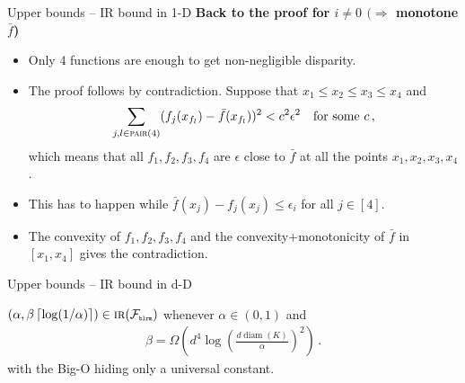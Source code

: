 \documentclass{beamer}
\newcommand{\pair}{\operatorname{\textsc{pair}}}
\newcommand{\diam}{\operatorname{diam}}
\newcommand{\cF}{\mathcal{F}}
\newcommand{\pr}{\text{\tiny\texttt{r}}}
\newcommand{\pb}{\text{\tiny\texttt{b}}}
\newcommand{\pl}{\text{\tiny\texttt{l}}}
\renewcommand{\pm}{\text{\tiny\texttt{m}}}
\newcommand{\IR}{\operatorname{\textsc{ir}}}
\newcommand{\ceil}[1]{\left\lceil #1 \right\rceil}
\begin{document}
\begin{frame}{Upper bounds -- IR bound in 1-D}
    \small
    \textbf{Back to the proof for $i \neq 0$ $( \Rightarrow $ monotone $\bar{f}$)}

    \begin{itemize}
        \item Only 4 functions are enough to get non-negligible disparity.
        \item The proof follows by contradiction.
              Suppose that $x_1 \leq x_2 \leq x_3 \leq x_4$ and
              \begin{align*}
                  \sum_{j,l \in \pair(4)} (f_j(x_{f_l}) - \bar f(x_{f_l}))^2 < c^2 \epsilon^2 \quad \text{for some }c\,,
              \end{align*}
              which means that all $f_1,f_2,f_3,f_4$ are $\epsilon$ close to $\bar{f}$ at all the points $x_1, x_2, x_3, x_4$.
        \item This has to happen while $\bar{f}(x_j) - f_j(x_j) \leq \epsilon_i$ for all $j\in[4]$.
        \item The convexity of $f_1,f_2,f_3,f_4$ and the convexity+monotonicity of $\bar{f}$ in $[x_1, x_4]$ gives the contradiction.
    \end{itemize}
\end{frame}


\begin{frame}{Upper bounds -- IR bound in d-D}
    \begin{tcolorbox}[title=Theorem 7 -- IR bound in d-D,colback=blue!5!white,colframe=blue!50!black]
        $(\alpha, \beta \ceil{\log(1/\alpha)}) \in \IR(\cF_{\pb\pl\pr\pm})$ whenever $\alpha \in (0,1)$ and
        \begin{align*}
            \beta = \Omega\left(d^4 \log\left(\frac{d \diam(K)}{\alpha}\right)^2\right) \,.
        \end{align*}
        with the Big-O hiding only a universal constant.
    \end{tcolorbox}
\end{frame}

\end{document}
